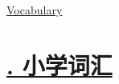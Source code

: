 \documentclass[11pt]{article}
\begin{document}
	\kaishu 
	\setcounter{section}{0}
	\begin{center}
		{\LARGE  \href{https://www.youtube.com/@jing-xin/playlists}{Vocabulary}}
	\end{center}
\setcounter{page}{1}

\vspace{-0.5cm}

\section*{\normalfont \large  \href{https://www.youtube.com/playlist?list=PLmbmjB9I926YykV2kITXccAGHdDQOtEov}{. 小学词汇} }

\vspace{-0.5cm}
\end{document}
